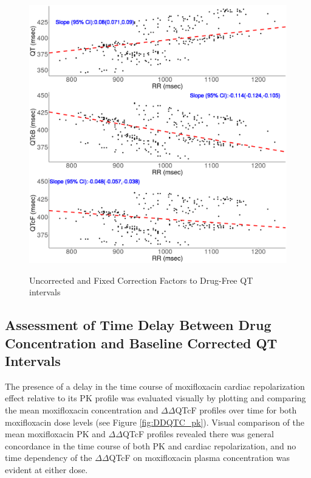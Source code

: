\documentclass[
]{article}
\begin{document}
\begin{figure}[H]
\caption{Uncorrected and Fixed Correction Factors to Drug-Free QT intervals} 
\includegraphics[width=\textwidth]{../Report/Figures/QTcorrection.png}
\label{fig:QTcorrection}
\end{figure}

\hypertarget{assessment-of-time-delay-between-drug-concentration-and-baseline-corrected-qt-intervals}{%
\subsection{Assessment of Time Delay Between Drug Concentration and
Baseline Corrected QT
Intervals}\label{assessment-of-time-delay-between-drug-concentration-and-baseline-corrected-qt-intervals}}

The presence of a delay in the time course of moxifloxacin cardiac
repolarization effect relative to its PK profile was evaluated visually
by plotting and comparing the mean moxifloxacin concentration and
\(\Delta \Delta\)QTcF profiles over time for both moxifloxacin dose
levels (see Figure \ref{fig:DDQTC_pk}). Visual comparison of the mean
moxifloxacin PK and \(\Delta \Delta\)QTcF profiles revealed there was
general concordance in the time course of both PK and cardiac
repolarization, and no time dependency of the \(\Delta \Delta\)QTcF on
moxifloxacin plasma concentration was evident at either dose.
\end{document}

